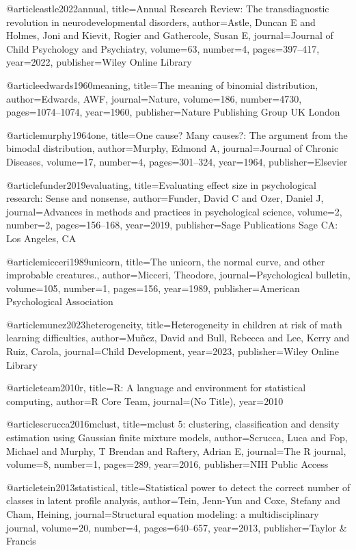 @article{astle2022annual,
  title={Annual Research Review: The transdiagnostic revolution in neurodevelopmental disorders},
  author={Astle, Duncan E and Holmes, Joni and Kievit, Rogier and Gathercole, Susan E},
  journal={Journal of Child Psychology and Psychiatry},
  volume={63},
  number={4},
  pages={397--417},
  year={2022},
  publisher={Wiley Online Library}
}

@article{edwards1960meaning,
  title={The meaning of binomial distribution},
  author={Edwards, AWF},
  journal={Nature},
  volume={186},
  number={4730},
  pages={1074--1074},
  year={1960},
  publisher={Nature Publishing Group UK London}
}

@article{murphy1964one,
  title={One cause? Many causes?: The argument from the bimodal distribution},
  author={Murphy, Edmond A},
  journal={Journal of Chronic Diseases},
  volume={17},
  number={4},
  pages={301--324},
  year={1964},
  publisher={Elsevier}
}

@article{funder2019evaluating,
  title={Evaluating effect size in psychological research: Sense and nonsense},
  author={Funder, David C and Ozer, Daniel J},
  journal={Advances in methods and practices in psychological science},
  volume={2},
  number={2},
  pages={156--168},
  year={2019},
  publisher={Sage Publications Sage CA: Los Angeles, CA}
}

@article{micceri1989unicorn,
  title={The unicorn, the normal curve, and other improbable creatures.},
  author={Micceri, Theodore},
  journal={Psychological bulletin},
  volume={105},
  number={1},
  pages={156},
  year={1989},
  publisher={American Psychological Association}
}

@article{munez2023heterogeneity,
  title={Heterogeneity in children at risk of math learning difficulties},
  author={Mu{\~n}ez, David and Bull, Rebecca and Lee, Kerry and Ruiz, Carola},
  journal={Child Development},
  year={2023},
  publisher={Wiley Online Library}
}

@article{team2010r,
  title={R: A language and environment for statistical computing},
  author={{R Core Team}},
  journal={(No Title)},
  year={2010}
}

@article{scrucca2016mclust,
  title={mclust 5: clustering, classification and density estimation using Gaussian finite mixture models},
  author={Scrucca, Luca and Fop, Michael and Murphy, T Brendan and Raftery, Adrian E},
  journal={The R journal},
  volume={8},
  number={1},
  pages={289},
  year={2016},
  publisher={NIH Public Access}
}


@article{tein2013statistical,
  title={Statistical power to detect the correct number of classes in latent profile analysis},
  author={Tein, Jenn-Yun and Coxe, Stefany and Cham, Heining},
  journal={Structural equation modeling: a multidisciplinary journal},
  volume={20},
  number={4},
  pages={640--657},
  year={2013},
  publisher={Taylor \& Francis}
}

